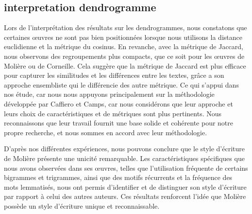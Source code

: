 \documentclass[]{report}
\begin{document}
\subsection{interpretation dendrogramme}

Lors de l'interprétation des résultats sur les dendrogrammes, nous constatons
que certaines œuvres ne sont pas bien positionnées lorsque nous utilisons la
distance euclidienne et la métrique du cosinus. En revanche, avec la métrique de
Jaccard, nous observons des regroupements plus compacts, que ce soit pour les
œuvres de Molière ou de Corneille. Cela suggère que la métrique de Jaccard est
plus efficace pour capturer les similitudes et les différences entre les textes,
grâce a son approche ensembliste qui le différencie des autre métrique. Ce qui
s'appui dans nos étude, car nous nous appuyons principalement sur la
méthodologie développée par Caffiero et Camps, car nous considérons que leur
approche et leurs choix de caractéristiques et de métriques sont plus pertinents.
Nous reconnaissons que leur travail fournit une base solide et cohérente pour
notre propre recherche, et nous sommes en accord avec leur méthodologie.

\vspace{\baselineskip} 
\hspace{0,5cm} D'après nos différentes expériences, nous
pouvons conclure que le style d'écriture de Molière présente une unicité
remarquable. Les caractéristiques spécifiques que nous avons observées dans ses
œuvres, telles que l'utilisation fréquente de certains bigrammes et trigrammes,
ainsi que des motifs récurrents et la fréquence des mots lemmatisés, nous ont
permis d'identifier et de distinguer son style d'écriture par rapport à celui
des autres auteurs. Ces résultats renforcent l'idée que Molière possède un style
d'écriture unique et reconnaissable.
\end{document}
